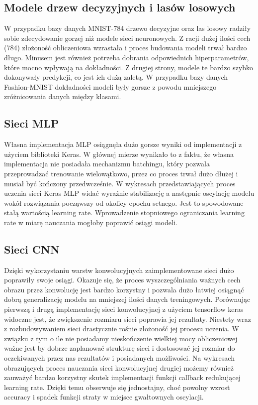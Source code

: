 \documentclass{article}
\begin{document}
\subsection*{Modele drzew decyzyjnych i lasów losowych}
W przypadku bazy danych MNIST-784 drzewo decyzyjne oraz las 
losowy radziły sobie zdecydowanie gorzej niż modele sieci neuronowych. 
Z racji dużej ilości cech (784) złożoność obliczeniowa wzrastała
i proces budowania modeli trwał bardzo długo. Minusem jest również
potrzeba dobrania odpowiednich hiperparametrów, które mocno wpływają
na dokładności. Z drugiej strony, modele te bardzo szybko dokonywały
predykcji, co jest ich dużą zaletą. W przypadku bazy danych Fashion-MNIST
dokładności modeli były gorsze z powodu mniejszego zróżnicowania danych
między klasami.

\subsection*{Sieci MLP}
Własna implementacja MLP osiągnęła dużo gorsze wyniki od 
implementacji z użyciem biblioteki Keras. W głównej 
mierze wynikało to z faktu, że własna implementacja nie 
posiadała mechanizmu batchingu, który pozwala przeprowadzać 
trenowanie wielowątkowo, przez co proces trwał dużo dłużej i 
musiał być kończony przedwcześnie. W wykresach przedstawiających 
proces uczenia sieci Keras MLP widać wyraźnie stabilizację a 
następnie oscylację modelu wokół rozwiązania począwszy od okolicy 
epochu setnego. Jest to spowodowane stałą wartością learning rate. 
Wprowadzenie stopniowego ograniczania learning rate w miarę nauczania 
mogłoby poprawić osiągi modeli.

\subsection*{Sieci CNN}
Dzięki wykorzystaniu warstw konwolucyjnych zaimplementowane sieci 
dużo poprawiły swoje osiągi. Okazuje się, że proces wyszczególniania 
ważnych cech obrazu przez konwolucję jest bardzo korzystny i pozwala 
dużo łatwiej osiągnąć dobrą generalizację modelu na mniejszej ilości 
danych treningowych. Porównując pierwszą i drugą implementację sieci 
konwolucyjnej z użyciem tensorflow keras widoczne jest, że zwiększenie 
rozmiaru sieci poprawia jej rezultaty. Niestety wraz z rozbudowywaniem 
sieci drastycznie rośnie złożoność jej procesu uczenia. W związku z tym 
o ile nie posiadamy nieskończenie wielkiej mocy obliczeniowej ważne jest 
by dobrze zaplanować strukturę sieci i dostosować jej rozmiar do 
oczekiwanych przez nas rezultatów i posiadanych możliwości. Na wykresach 
obrazujących proces nauczania sieci konwolucyjnej drugiej możemy również 
zauważyć bardzo korzystny skutek implementacji funkcji callback redukującej 
learning rate. Dzięki temu obserwuje się jednostajny, choć powolny wzrost 
accuracy i spadek funkcji straty w miejsce gwałtownych oscylacji.
\end{document}
